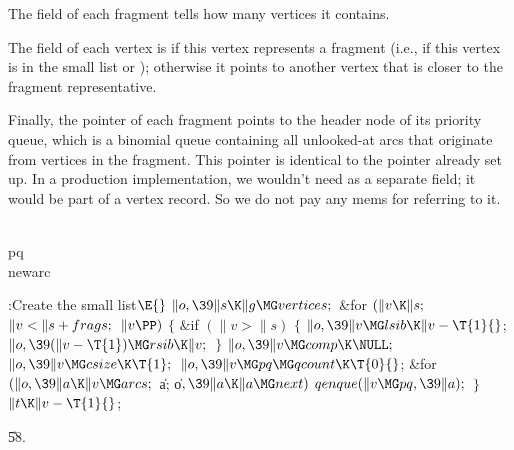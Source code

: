 The  field of each fragment tells how many vertices it contains.

The  field of each vertex is \PB{$\NULL$} if this vertex
represents a
fragment (i.e., if this vertex is in the small list or );
otherwise it points to another vertex that is closer to the fragment
representative.

Finally, the  pointer of each fragment points to the header node of
its priority queue, which is a binomial queue containing all
unlooked-at arcs that originate from vertices in the fragment.
This pointer is identical to the  pointer already set up.
In a production implementation, we wouldn't need  as a
separate field; it would be part of a vertex record. So we do not
pay any mems for referring to it.

\Y\B\4\D\\{pq}\5
\\{newarc}\par
\Y\B\4:Create the small list\X${}\E{}$\6
$\|o,\39\|s\K\|g\MG\\{vertices};{}$\6
\&{for} ${}(\|v\K\|s;{}$ ${}\|v<\|s+\\{frags};{}$ ${}\|v\PP){}$\5
${}\{{}$\1\6
\&{if} ${}(\|v>\|s){}$\5
${}\{{}$\1\6
${}\|o,\39\|v\MG\\{lsib}\K\|v-\T{1}{}$;\5
${}\|o,\39(\|v-\T{1})\MG\\{rsib}\K\|v;{}$\6
\4${}\}{}$\2\6
${}\|o,\39\|v\MG\\{comp}\K\NULL;{}$\6
${}\|o,\39\|v\MG\\{csize}\K\T{1};{}$\6
${}\|o,\39\|v\MG\\{pq}\MG\\{qcount}\K\T{0}{}$;\6
\&{for} ${}(\|o,\39\|a\K\|v\MG\\{arcs};{}$ \|a; \|o${},\39\|a\K\|a\MG%
\\{next}){}$\1\5
${}\\{qenque}(\|v\MG\\{pq},\39\|a);{}$\2\6
\4${}\}{}$\2\6
${}\|t\K\|v-\T{1}{}$;\par
\U58.\fi

